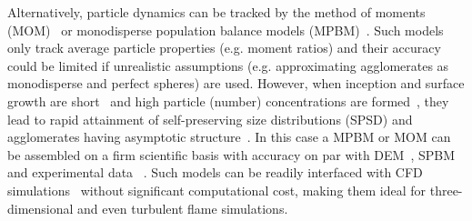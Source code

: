 
Alternatively, particle dynamics can be tracked by the method of moments (MOM)~\citep{kazakov1998dynamic} or monodisperse population balance models (MPBM)~\citep{kruis1993simple}. Such models only track average particle properties (e.g. moment ratios) and their accuracy could be limited if unrealistic assumptions (e.g. approximating agglomerates as monodisperse and perfect spheres) are used. However, when inception and surface growth are short~\citep{Spicer2002} and high particle (number) concentrations are formed~\cite{Kelesidis2017}, they lead to rapid attainment of self-preserving size distributions (SPSD) and agglomerates having asymptotic structure~\citep{Goudeli2016}. In this case a MPBM or MOM can be assembled on a firm scientific basis with accuracy on par with DEM~\citep{Kelesidis2017Flame}, SPBM~\citep{kelesidis2019estimating} and experimental data ~\citep{abid2008evolution, ma2013soot, camacho2015mobility}. Such models can be readily interfaced with CFD simulations~\citep{grohn2012fluid} without significant computational cost, making them ideal for three-dimensional and even turbulent flame simulations. 

